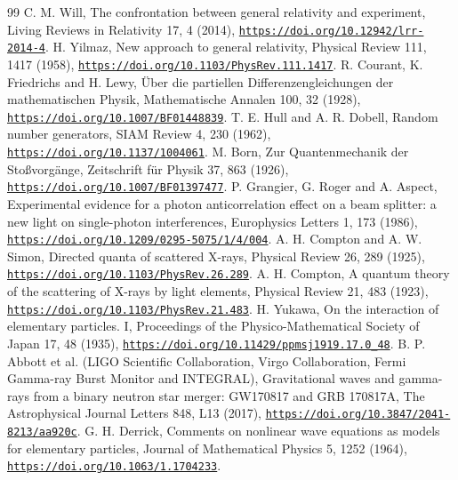 \documentclass[pdflatex,sn-mathphys-num]{sn-jnl}
\theoremstyle{thmstyleone}
\theoremstyle{thmstyletwo}
\begin{document}
\begin{thebibliography}{99}
 C. M. Will, The confrontation between general relativity and experiment, Living Reviews in Relativity 17, 4 (2014), \href{https://doi.org/10.12942/lrr-2014-4}{\nolinkurl{https://doi.org/10.12942/lrr-2014-4}}.
 H. Yilmaz, New approach to general relativity, Physical Review 111, 1417 (1958), \href{https://doi.org/10.1103/PhysRev.111.1417}{\nolinkurl{https://doi.org/10.1103/PhysRev.111.1417}}.
 R. Courant, K. Friedrichs and H. Lewy, \"Uber die partiellen Differenzengleichungen der mathematischen Physik, Mathematische Annalen 100, 32 (1928), \href{https://doi.org/10.1007/BF01448839}{\nolinkurl{https://doi.org/10.1007/BF01448839}}.
 T. E. Hull and A. R. Dobell, Random number generators, SIAM Review 4, 230 (1962), \href{https://doi.org/10.1137/1004061}{\nolinkurl{https://doi.org/10.1137/1004061}}.
 M. Born, Zur Quantenmechanik der Sto\ss{}vorg\"ange, Zeitschrift f\"ur Physik 37, 863 (1926), \href{https://doi.org/10.1007/BF01397477}{\nolinkurl{https://doi.org/10.1007/BF01397477}}.
 P. Grangier, G. Roger and A. Aspect, Experimental evidence for a photon anticorrelation effect on a beam splitter: a new light on single-photon interferences, Europhysics Letters 1, 173 (1986), \href{https://doi.org/10.1209/0295-5075/1/4/004}{\nolinkurl{https://doi.org/10.1209/0295-5075/1/4/004}}.
 A. H. Compton and A. W. Simon, Directed quanta of scattered X-rays, Physical Review 26, 289 (1925), \href{https://doi.org/10.1103/PhysRev.26.289}{\nolinkurl{https://doi.org/10.1103/PhysRev.26.289}}.
 A. H. Compton, A quantum theory of the scattering of X-rays by light elements, Physical Review 21, 483 (1923), \href{https://doi.org/10.1103/PhysRev.21.483}{\nolinkurl{https://doi.org/10.1103/PhysRev.21.483}}.
 H. Yukawa, On the interaction of elementary particles. I, Proceedings of the Physico-Mathematical Society of Japan 17, 48 (1935), \href{https://doi.org/10.11429/ppmsj1919.17.0_48}{\nolinkurl{https://doi.org/10.11429/ppmsj1919.17.0_48}}.
 B. P. Abbott et al. (LIGO Scientific Collaboration, Virgo Collaboration, Fermi Gamma-ray Burst Monitor and INTEGRAL), Gravitational waves and gamma-rays from a binary neutron star merger: GW170817 and GRB 170817A, The Astrophysical Journal Letters 848, L13 (2017), \href{https://doi.org/10.3847/2041-8213/aa920c}{\nolinkurl{https://doi.org/10.3847/2041-8213/aa920c}}.
 G. H. Derrick, Comments on nonlinear wave equations as models for elementary particles, Journal of Mathematical Physics 5, 1252 (1964), \href{https://doi.org/10.1063/1.1704233}{\nolinkurl{https://doi.org/10.1063/1.1704233}}.

\end{thebibliography}
\end{document}
